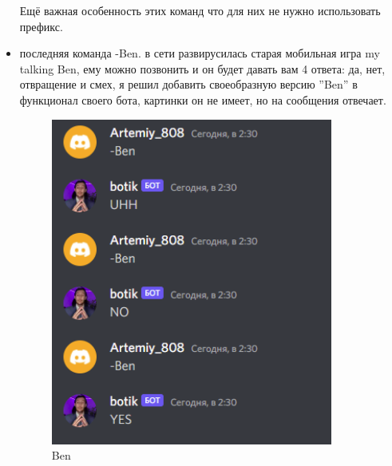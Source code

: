 \documentclass[a4paper,12pt]{article}
\begin{document}
\begin{itemize}
    Ещё важная особенность этих команд что для них не нужно использовать префикс.
\newpage
    \item последняя команда -Ben. в сети развирусилась старая мобильная игра my talking Ben, ему можно позвонить и он будет давать вам 4 ответа: да, нет, отвращение и смех, я решил добавить своеобразную версию ''Ben'' в функционал своего бота, картинки он не имеет, но на сообщения отвечает.
    \begin{figure}[h]
    \centering
    \includegraphics[width = 350px]{pictures/Ben.png}
    \caption{Ben}
    \label{fig:my_label18}
    \end{figure}
\end{itemize}

\newpage
\end{document}
